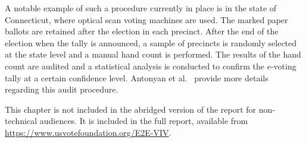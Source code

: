 A notable example of such a procedure currently in place is in the
state of Connecticut, where optical scan voting machines are used. The
marked paper ballots are retained after the election in each precinct.
After the end of the election when the tally is announced, a sample of
precincts is randomly selected at the state level and a manual hand
count is performed. The results of the hand count are audited and a
statistical analysis is conducted to confirm the e-voting tally at a
certain confidence level. Antonyan et al.~\cite{antonyan2009state}
provide more details regarding this audit procedure.

\else %

This chapter is not included in the abridged version of the report for
non-technical audiences. It is included in the full report,
available from \url{https://www.usvotefoundation.org/E2E-VIV}.

\fi

